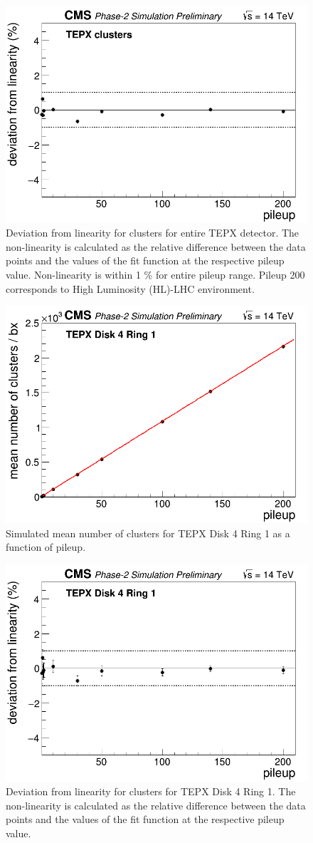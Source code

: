 \begin{figure}[H]
  \centering
  \includegraphics[width=0.5\columnwidth]{./TEPX_totalcluster_residuals.png}
  \caption{Deviation from linearity for clusters for entire TEPX detector. The non-linearity is calculated as the relative difference between the data points and the values of the fit function at the respective pileup value. Non-linearity is within 1 \% for entire pileup range. Pileup 200 corresponds to High Luminosity (HL)-LHC environment.}
  \label{fig:CMS}
\end{figure}


\begin{figure}[H]
  \centering
  \includegraphics[width=0.5\columnwidth]{./TEPX_Disk_4_Ring_1_mean_number_of_clusters___bx_Linearity.png}
  \caption{Simulated mean number of clusters for TEPX Disk 4 Ring 1 as a function of pileup.}
  \label{fig:CMS}
\end{figure}


\begin{figure}[H]
  \centering
  \includegraphics[width=0.5\columnwidth]{./TEPX_Disk_4_Ring_1_mean_number_of_clusters___bx_Linearity_residuals.png}
  \caption{Deviation from linearity for clusters for TEPX Disk 4 Ring 1. The non-linearity is calculated as the relative difference between the data points and the values of the fit function at the respective pileup value.}
  \label{fig:CMS}
\end{figure}




